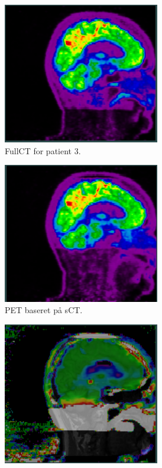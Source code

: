 \begin{figure}
\begin{subfigure}{0.3\textwidth}
        \includegraphics[width=0.75\textwidth]{colager/loocv_pet/loocv_010850_pet_ct.png}
        \caption{FullCT for patient 3.}
        \label{col:loocv_pet_pat3_ct}
    \end{subfigure}\hfill
    \begin{subfigure}{0.3\textwidth}
        \centering
        \includegraphics[width=0.75\textwidth]{colager/loocv_pet/loocv_010850_pet_sct.png}
        \caption{PET baseret på sCT.}
        \label{col:loocv_pet_pat3_sct}
    \end{subfigure}\hfill
    \begin{subfigure}{0.3\textwidth}
        \centering
        \includegraphics[width=0.75\textwidth]{colager/loocv_pet/loocv_010850_pet_pd.png}

\end{subfigure}
\end{figure}
